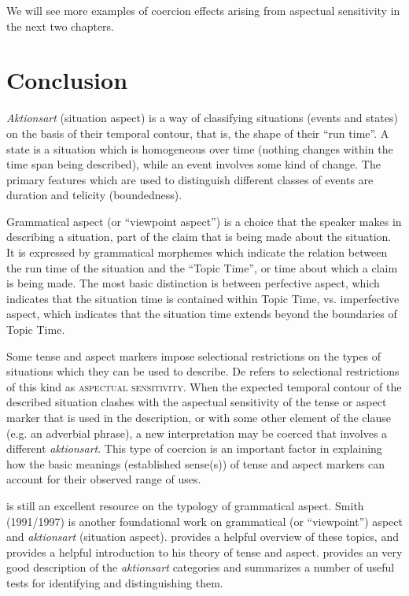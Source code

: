 We will see more examples of coercion effects arising from aspectual sensitivity in the next two chapters.


\section{Conclusion}\label{sec:} %

\textit{Aktionsart} (situation aspect) is a way of classifying situations (events and states) on the basis of their temporal contour, that is, the shape of their “run time”. A state is a situation which is homogeneous over time (nothing changes within the time span being described), while an event involves some kind of change. The primary features which are used to distinguish different classes of events are duration and telicity (boundedness).



Grammatical aspect (or “viewpoint aspect”) is a choice that the speaker makes in describing a situation, part of the claim that is being made about the situation. It is expressed by grammatical morphemes which indicate the relation between the run time of the situation and the “Topic Time”, or time about which a claim is being made. The most basic distinction is between perfective aspect, which indicates that the situation time is contained within Topic Time, vs. imperfective aspect, which indicates that the situation time extends beyond the boundaries of Topic Time.



Some tense and aspect markers impose selectional restrictions on the types of situations which they can be used to describe. De \citet{Swart1998} refers to selectional restrictions of this kind as \textsc{aspectual sensitivity}. When the expected temporal contour of the described situation clashes with the aspectual sensitivity of the tense or aspect marker that is used in the description, or with some other element of the clause (e.g. an adverbial phrase), a new interpretation may be coerced that involves a different \textit{aktionsart}. This type of coercion is an important factor in explaining how the basic meanings (established sense(s)) of tense and aspect markers can account for their observed range of uses.



\furtherreading



\citet{Comrie1976} is still an excellent resource on the typology of grammatical aspect. Smith (1991/1997) is another foundational work on grammatical (or “viewpoint”) aspect and \textit{aktionsart} (situation aspect). \citet{Binnick2006} provides a helpful overview of these topics, and \citet{Klein2009} provides a helpful introduction to his theory of tense and aspect. \citet{Dowty1979} provides an very good description of the \textit{aktionsart} categories and summarizes a number of useful tests for identifying and distinguishing them.


